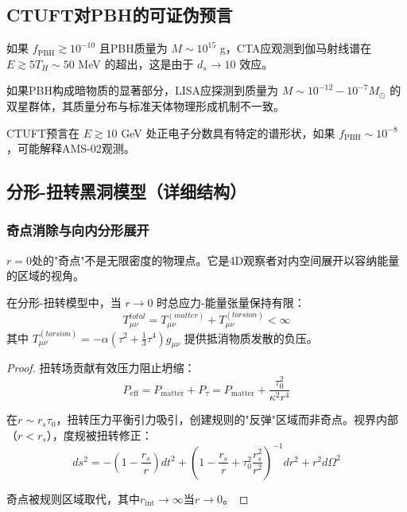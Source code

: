 \subsection{CTUFT对PBH的可证伪预言}

\begin{prediction}[高能谱增强]
如果 $f_{\text{PBH}} \gtrsim 10^{-10}$ 且PBH质量为 $M \sim 10^{15}$ g，CTA应观测到伽马射线谱在 $E \gtrsim 5 T_H \sim 50$ MeV 的超出，这是由于 $d_s \to 10$ 效应。
\end{prediction}

\begin{prediction}[PBH质量谱异常]
如果PBH构成暗物质的显著部分，LISA应探测到质量为 $M \sim 10^{-12} - 10^{-7} M_\odot$ 的双星群体，其质量分布与标准天体物理形成机制不一致。
\end{prediction}

\begin{prediction}[正电子超出信号]
CTUFT预言在 $E \gtrsim 10$ GeV 处正电子分数具有特定的谱形状，如果 $f_{\text{PBH}} \sim 10^{-8}$，可能解释AMS-02观测。
\end{prediction}

\subsection{分形-扭转黑洞模型（详细结构）}

\subsubsection{奇点消除与向内分形展开}

\begin{insight}[奇点是视角效应]
$r = 0$处的"奇点"不是无限密度的物理点。它是4D观察者对内空间展开以容纳能量的区域的视角。
\end{insight}

\begin{theorem}[规则核心定理]
在分形-扭转模型中，当 $r \to 0$ 时总应力-能量张量保持有限：
\begin{equation}
    T^{total}_{\mu\nu} = T^{(matter)}_{\mu\nu} + T^{(torsion)}_{\mu\nu} < \infty
\end{equation}
其中 $T^{(torsion)}_{\mu\nu} = -\alpha(\tau^2 + \frac{1}{3}\tau^4)g_{\mu\nu}$ 提供抵消物质发散的负压。
\end{theorem}

\begin{proof}
扭转场贡献有效压力阻止坍缩：
\begin{equation}
    P_{\text{eff}} = P_{\text{matter}} + P_{\tau} = P_{\text{matter}} + \frac{\tau_0^2}{\kappa^2 r^4}
\end{equation}

在$r \sim r_s \tau_0$，扭转压力平衡引力吸引，创建规则的"反弹"区域而非奇点。视界内部（$r < r_s$），度规被扭转修正：
\begin{equation}
    ds^2 = -\left(1 - \frac{r_s}{r}\right)dt^2 + \left(1 - \frac{r_s}{r} + \tau_0^2\frac{r_s^2}{r^2}\right)^{-1}dr^2 + r^2 d\Omega^2
\end{equation}

奇点被规则区域取代，其中$r_{\text{int}} \to \infty$当$r \to 0$。
\end{proof}

